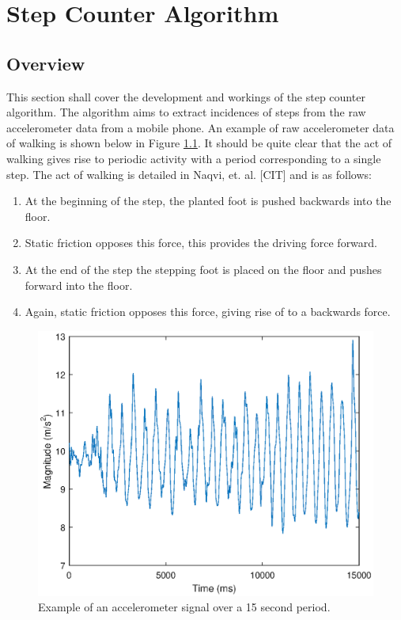 \part{Step Counter Algorithm}

    \chapter{Overview}

        This section shall cover the development and workings of the step counter algorithm. The algorithm aims to extract incidences of steps from the raw accelerometer data from a mobile phone. An example of raw accelerometer data of walking is shown below in Figure \ref{img_accel_ex}. It should be quite clear that the act of walking gives rise to periodic activity with a period corresponding to a single step. The act of walking is detailed in Naqvi, et. al. [CIT] and is as follows:

        \begin{enumerate}
            \item At the beginning of the step, the planted foot is pushed backwards into the floor.
            \item Static friction opposes this force, this provides the driving force forward.
            \item At the end of the step the stepping foot is placed on the floor and pushes forward into the floor.
            \item Again, static friction opposes this force, giving rise of to a backwards force.
        \end{enumerate}

        \begin{figure}[h]
            \includegraphics[width=\textwidth]{Images/accel_signal.eps}
            \centering
            \caption{Example of an accelerometer signal over a 15 second period.}
            \label{img_accel_ex}
        \end{figure}

